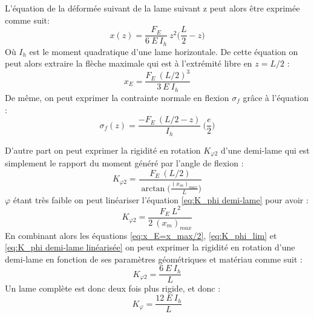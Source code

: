 L'équation de la déformée suivant de la lame suivant z peut alors être exprimée comme suit:
\begin{equation}
		x(z) = \frac{F_E}{6\ E\ I_h}\ z^2 \biggl( \frac{L}{2} - z \biggr)
\label{eq:deformée_encastrée-libre}
\end{equation} 
Où $I_h$ est le moment quadratique d'une lame horizontale. De cette équation on peut alors extraire la flèche maximale qui est à l'extrémité libre en $z=L/2$ :
\begin{equation}
		x_E = \frac{F_E\ (L/2)^3}{3\ E\ I_h}
\label{eq:fleche_encastrée-libre}
\end{equation} 	
De même, on peut exprimer la contrainte normale en flexion $\sigma _f$ grâce à l'équation :
\begin{equation}
	\sigma _f(z) = \frac{-F_E\ (L/2 - z)}{I_h}\ \biggl( \frac{e}{2} \biggr)
\end{equation}

D'autre part on peut exprimer la rigidité en rotation $K_{\varphi 2}$ d'une demi-lame qui est simplement le rapport du moment généré par l'angle de flexion :
\begin{equation}
		K_{\varphi 2} =  \frac{F_E\ (L/2)}{\arctan \biggl( \frac{(x_m)_{max}}{L} \biggr)}
\label{eq:K_phi demi-lame}
\end{equation}
$\varphi$ étant très faible on peut linéariser l'équation  \ref{eq:K_phi demi-lame} pour avoir :
\begin{equation}
		K_{\varphi 2} =  \frac{F_E\ L^2}{2\ (x_m)_{max}}
\label{eq:K_phi demi-lame linéarisée}
\end{equation}
En combinant alors les équations \ref{eq:x_E=x_max/2}, \ref{eq:K_phi_lim} et \ref{eq:K_phi demi-lame linéarisée} on peut exprimer la rigidité en rotation d'une demi-lame en fonction de ses paramètres géométriques et matériau comme suit :
\begin{equation}
		K_{\varphi 2} = \frac{6\ E\ I_h}{L}
		\label{eq:K_phi demi-lame final}
\end{equation}
Un lame complète est donc deux fois plus rigide, et donc :
\begin{equation}
		K_{\varphi} = \frac{12\ E\ I_h}{L}
		\label{eq:K_phi lame entière final}
\end{equation}

